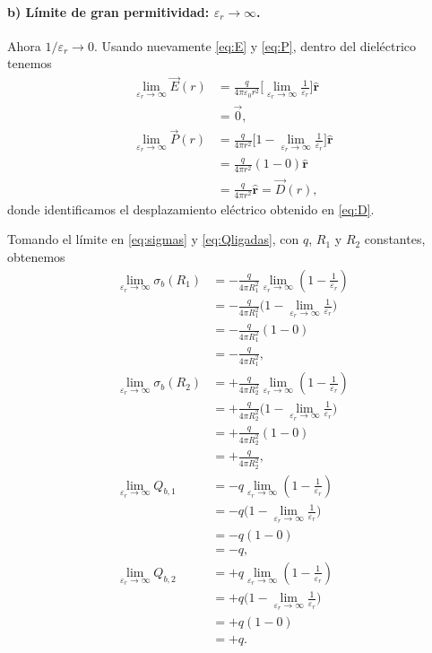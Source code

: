 \documentclass[11pt]{article}
\newcommand{\er}{\hat{\mathbf r}}
\begin{document}
\paragraph{b) Límite de gran permitividad:
$\varepsilon_r\to\infty$.}

Ahora $1/\varepsilon_r\to0$. Usando nuevamente
\eqref{eq:E} y \eqref{eq:P}, dentro del dieléctrico tenemos
\begin{align*}
  \lim_{\varepsilon_r\to\infty}\vec E(r)
    &=\frac{q}{4\pi\varepsilon_0r^2}
      \Biggl[
        \lim_{\varepsilon_r\to\infty}
        \frac{1}{\varepsilon_r}
      \Biggr]\er\\
    &=\vec0,\\[8pt]
  \lim_{\varepsilon_r\to\infty}\vec P(r)
    &=\frac{q}{4\pi r^2}
      \Biggl[
        1-\lim_{\varepsilon_r\to\infty}
        \frac{1}{\varepsilon_r}
      \Biggr]\er\\
    &=\frac{q}{4\pi r^2}(1-0)\er\\
    &=\frac{q}{4\pi r^2}\er
      =\vec D(r),
\end{align*}
donde identificamos el desplazamiento eléctrico obtenido
en \eqref{eq:D}.

Tomando el límite en \eqref{eq:sigmas} y
\eqref{eq:Qligadas}, con $q$, $R_1$ y $R_2$ constantes,
obtenemos
\begin{align*}
  \lim_{\varepsilon_r\to\infty}\sigma_b(R_1)
    &=-\frac{q}{4\pi R_1^2}
      \lim_{\varepsilon_r\to\infty}
      \left(1-\frac{1}{\varepsilon_r}\right)\\
    &=-\frac{q}{4\pi R_1^2}
      \Biggl(
        1-\lim_{\varepsilon_r\to\infty}
        \frac{1}{\varepsilon_r}
      \Biggr)\\
    &=-\frac{q}{4\pi R_1^2}(1-0)\\
    &=-\frac{q}{4\pi R_1^2},\\[10pt]
  \lim_{\varepsilon_r\to\infty}\sigma_b(R_2)
    &=+\frac{q}{4\pi R_2^2}
      \lim_{\varepsilon_r\to\infty}
      \left(1-\frac{1}{\varepsilon_r}\right)\\
    &=+\frac{q}{4\pi R_2^2}
      \Biggl(
        1-\lim_{\varepsilon_r\to\infty}
        \frac{1}{\varepsilon_r}
      \Biggr)\\
    &=+\frac{q}{4\pi R_2^2}(1-0)\\
    &=+\frac{q}{4\pi R_2^2},\\[10pt]
  \lim_{\varepsilon_r\to\infty}Q_{b,1}
    &=-q\lim_{\varepsilon_r\to\infty}
      \left(1-\frac{1}{\varepsilon_r}\right)\\
    &=-q\Biggl(
        1-\lim_{\varepsilon_r\to\infty}
        \frac{1}{\varepsilon_r}
      \Biggr)\\
    &=-q(1-0)\\
    &=-q,\\[10pt]
  \lim_{\varepsilon_r\to\infty}Q_{b,2}
    &=+q\lim_{\varepsilon_r\to\infty}
      \left(1-\frac{1}{\varepsilon_r}\right)\\
    &=+q\Biggl(
        1-\lim_{\varepsilon_r\to\infty}
        \frac{1}{\varepsilon_r}
      \Biggr)\\
    &=+q(1-0)\\
    &=+q.
\end{align*}
\end{document}
